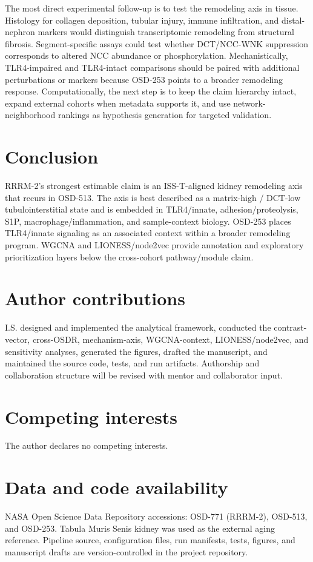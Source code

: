 \documentclass[11pt]{article}
\begin{document}
The most direct experimental follow-up is to test the remodeling axis in tissue. Histology for collagen deposition, tubular injury, immune infiltration, and distal-nephron markers would distinguish transcriptomic remodeling from structural fibrosis. Segment-specific assays could test whether DCT/NCC-WNK suppression corresponds to altered NCC abundance or phosphorylation. Mechanistically, TLR4-impaired and TLR4-intact comparisons should be paired with additional perturbations or markers because OSD-253 points to a broader remodeling response. Computationally, the next step is to keep the claim hierarchy intact, expand external cohorts when metadata supports it, and use network-neighborhood rankings as hypothesis generation for targeted validation.

\section{Conclusion}

RRRM-2's strongest estimable claim is an ISS-T-aligned kidney remodeling axis that recurs in OSD-513. The axis is best described as a matrix-high / DCT-low tubulointerstitial state and is embedded in TLR4/innate, adhesion/proteolysis, S1P, macrophage/inflammation, and sample-context biology. OSD-253 places TLR4/innate signaling as an associated context within a broader remodeling program. WGCNA and LIONESS/node2vec provide annotation and exploratory prioritization layers below the cross-cohort pathway/module claim.

\section*{Author contributions}
I.S. designed and implemented the analytical framework, conducted the contrast-vector, cross-OSDR, mechanism-axis, WGCNA-context, LIONESS/node2vec, and sensitivity analyses, generated the figures, drafted the manuscript, and maintained the source code, tests, and run artifacts. Authorship and collaboration structure will be revised with mentor and collaborator input.

\section*{Competing interests}
The author declares no competing interests.

\section*{Data and code availability}
NASA Open Science Data Repository accessions: OSD-771 (RRRM-2), OSD-513, and OSD-253. Tabula Muris Senis kidney was used as the external aging reference. Pipeline source, configuration files, run manifests, tests, figures, and manuscript drafts are version-controlled in the project repository.
\end{document}
